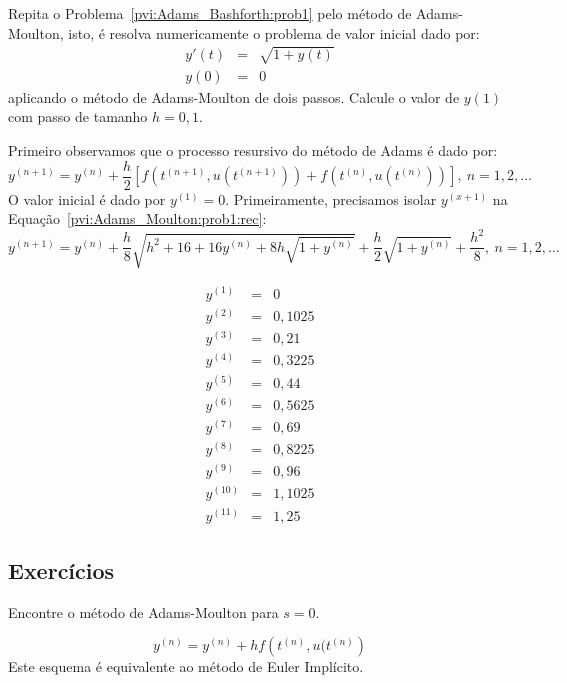 \begin{exeresol}\label{pvi:Adams_Moulton:prob1} Repita o Problema~\ref{pvi:Adams_Bashforth:prob1} pelo método de Adams-Moulton, isto, é  resolva numericamente o problema de valor inicial dado por:
\begin{eqnarray*}
 y'(t)&=& \sqrt{1+y(t)}\\
 y(0)&=& 0
\end{eqnarray*}
aplicando o método de Adams-Moulton de dois passos. Calcule o valor de $y(1)$ com passo de tamanho $h=0,1$.
\end{exeresol}
\begin{resol} 
Primeiro observamos que o processo resursivo do método de Adams é dado por: 
\begin{equation}\label{pvi:Adams_Moulton:prob1:rec}
  y^{(n+1)}=y^{(n)}+\frac{h}{2}\left[f\left(t^{(n+1)},u(t^{(n+1)})\right)+f\left(t^{(n)},u(t^{(n)})\right)\right],~n=1,2,\ldots
 \end{equation}
O valor inicial é dado por $y^{(1)}=0$. Primeiramente, precisamos isolar $y^{(x+1)}$ na Equação~\ref{pvi:Adams_Moulton:prob1:rec}:
\begin{equation*}
  y^{(n+1)}=y^{(n)}+\frac{h}{8} \sqrt {{h}^{2}+16+16y^{(n)}+8h\sqrt {1+y^{(n)}}} +\frac{h}{2}\sqrt {1+y^{(n)}}+\frac{h^2}{8},~n=1,2,\ldots
 \end{equation*}

  \begin{eqnarray*}
 y^{(1)}&=&0\\
 y^{(2)}&=&0,1025\\
y^{(3)}&=&0,21\\
y^{(4)}&=&0,3225\\
y^{(5)}&=&0,44\\
y^{(6)}&=&0,5625\\
y^{(7)}&=&0,69\\
y^{(8)}&=&0,8225\\
y^{(9)}&=&0,96\\
y^{(10)}&=&1,1025\\
y^{(11)}&=&1,25
\end{eqnarray*}

\end{resol}




\subsection*{Exercícios}

\begin{exer}
Encontre o método de Adams-Moulton para $s=0$.
\end{exer}
\begin{resp}
 \begin{equation*}
  y^{(n)}=y^{(n)}+hf\left(t^{(n)},u(t^{(n)}\right)
 \end{equation*}
Este esquema é equivalente ao método de Euler Implícito.
 \end{resp}



